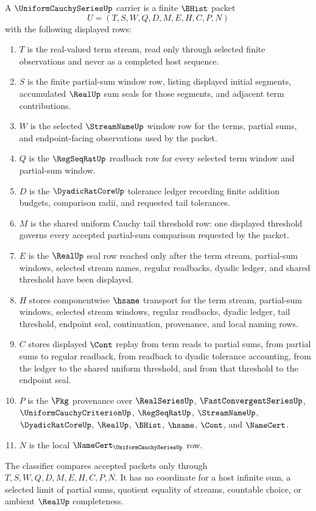 \begin{definition}\label{def:uniform-cauchy-series-carrier}
A $\UniformCauchySeriesUp$ carrier is a finite $\BHist$ packet
$$
U=(T,S,W,Q,D,M,E,H,C,P,N)
$$
with the following displayed rows:
\begin{enumerate}
\item $T$ is the real-valued term stream, read only through selected finite observations and never as a completed host sequence.
\item $S$ is the finite partial-sum window row, listing displayed initial segments, accumulated $\RealUp$ sum seals for those segments, and adjacent term contributions.
\item $W$ is the selected $\StreamNameUp$ window row for the terms, partial sums, and endpoint-facing observations used by the packet.
\item $Q$ is the $\RegSeqRatUp$ readback row for every selected term window and partial-sum window.
\item $D$ is the $\DyadicRatCoreUp$ tolerance ledger recording finite addition budgets, comparison radii, and requested tail tolerances.
\item $M$ is the shared uniform Cauchy tail threshold row: one displayed threshold governs every accepted partial-sum comparison requested by the packet.
\item $E$ is the $\RealUp$ seal row reached only after the term stream, partial-sum windows, selected stream names, regular readbacks, dyadic ledger, and shared threshold have been displayed.
\item $H$ stores componentwise $\hsame$ transport for the term stream, partial-sum windows, selected stream windows, regular readbacks, dyadic ledger, tail threshold, endpoint seal, continuation, provenance, and local naming rows.
\item $C$ stores displayed $\Cont$ replay from term reads to partial sums, from partial sums to regular readback, from readback to dyadic tolerance accounting, from the ledger to the shared uniform threshold, and from that threshold to the endpoint seal.
\item $P$ is the $\Pkg$ provenance over $\RealSeriesUp$, $\FastConvergentSeriesUp$, $\UniformCauchyCriterionUp$, $\RegSeqRatUp$, $\StreamNameUp$, $\DyadicRatCoreUp$, $\RealUp$, $\BHist$, $\hsame$, $\Cont$, and $\NameCert$.
\item $N$ is the local $\NameCert_{\UniformCauchySeriesUp}$ row.
\end{enumerate}
The classifier compares accepted packets only through $T,S,W,Q,D,M,E,H,C,P,N$. It has no coordinate for a host infinite sum, a selected limit of partial sums, quotient equality of streams, countable choice, or ambient $\RealUp$ completeness.
\end{definition}

